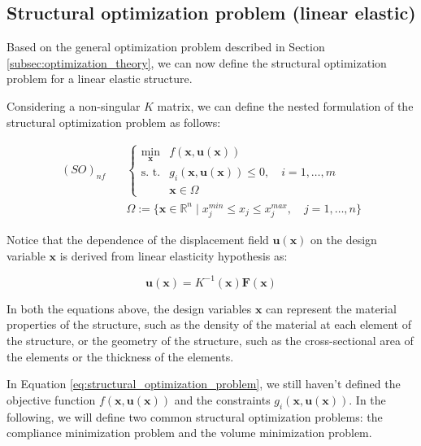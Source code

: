 \subsection{Structural optimization problem (linear elastic)}
\label{subsec:structural_optimization_problem}

Based on the general optimization problem described in Section \ref{subsec:optimization_theory}, we can now define the structural optimization problem for a linear elastic structure.

Considering a non-singular $K$ matrix, we can define the nested formulation of the structural optimization problem as follows:

\begin{equation}
    \begin{aligned}
        (SO)_{nf} \quad & \begin{cases}
                              \min_{\bm{x}} & f(\bm{x}, \bm{u}(\bm{x}))                                \\
                              \text{s. t.}  & g_i(\bm{x}, \bm{u}(\bm{x})) \le 0, \quad i = 1, \dots, m \\
                                            & \bm{x} \in \Omega
                          \end{cases}             \\
                        & \Omega := \{ \bm{x} \in \mathbb{R}^n \mid x_j^{min} \le x_j \le x_j^{max}, \quad j = 1, \dots, n \}
    \end{aligned}
    \label{eq:structural_optimization_problem}
\end{equation}

Notice that the dependence of the displacement field $\bm{u}(\bm{x})$ on the design variable $\bm{x}$ is derived from linear elasticity hypothesis as:

\begin{equation}
    \bm{u}(\bm{x}) = K^{-1}(\bm{x}) \bm{F}(\bm{x})
    \label{eq:displacement_field}
\end{equation}

In both the equations above, the design variables $\bm{x}$ can represent the material properties of the structure, such as the density of the material at each element of the structure, or the geometry of the structure, such as the cross-sectional area of the elements or the thickness of the elements.

In Equation \ref{eq:structural_optimization_problem}, we still haven't defined the objective function $f(\bm{x}, \bm{u}(\bm{x}))$ and the constraints $g_i(\bm{x}, \bm{u}(\bm{x}))$.
In the following, we will define two common structural optimization problems: the compliance minimization problem and the volume minimization problem.


